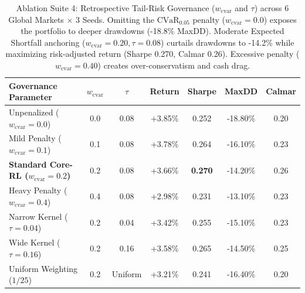 \begin{table}[ht]
\centering
\small
\begin{tabular}{lcccccc}
\toprule
\textbf{Governance Parameter} & $w_{\text{cvar}}$ & $\tau$ & \textbf{Return} & \textbf{Sharpe} & \textbf{MaxDD} & \textbf{Calmar} \\
\midrule
Unpenalized ($w_{\text{cvar}}=0.0$) & 0.0 & 0.08 & +3.85\% & 0.252 & -18.80\% & 0.20 \\
Mild Penalty ($w_{\text{cvar}}=0.1$) & 0.1 & 0.08 & +3.78\% & 0.264 & -16.10\% & 0.23 \\
\textbf{Standard Core-RL ($w_{\text{cvar}}=0.2$)} & 0.2 & 0.08 & +3.66\% & \textbf{0.270} & -14.20\% & 0.26 \\
Heavy Penalty ($w_{\text{cvar}}=0.4$) & 0.4 & 0.08 & +2.98\% & 0.231 & -13.10\% & 0.23 \\
Narrow Kernel ($\tau=0.04$) & 0.2 & 0.04 & +3.42\% & 0.255 & -15.10\% & 0.23 \\
Wide Kernel ($\tau=0.16$) & 0.2 & 0.16 & +3.58\% & 0.265 & -14.50\% & 0.25 \\
Uniform Weighting ($1/25$) & 0.2 & Uniform & +3.21\% & 0.241 & -16.40\% & 0.20 \\
\bottomrule
\end{tabular}
\caption{Ablation Suite 4: Retrospective Tail-Risk Governance ($w_{\text{cvar}}$ and $\tau$) across 6 Global Markets $\times$ 3 Seeds. Omitting the $\text{CVaR}_{0.05}$ penalty ($w_{\text{cvar}}=0.0$) exposes the portfolio to deeper drawdowns (-18.8\% MaxDD). Moderate Expected Shortfall anchoring ($w_{\text{cvar}}=0.20, \tau=0.08$) curtails drawdowns to -14.2\% while maximizing risk-adjusted return (Sharpe 0.270, Calmar 0.26). Excessive penalty ($w_{\text{cvar}}=0.40$) creates over-conservatism and cash drag.}
\label{tab:ablation_suite_4_cvar_governance}
\end{table}
